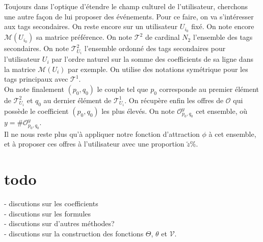\documentclass[11pt, oneside]{article}
\begin{document}
Toujours dans l'optique d'étendre le champ culturel de l'utilisateur, cherchons une autre façon de lui proposer des événements. Pour ce faire, on va s'intéresser aux tags secondaires. On reste encore sur un utilisateur $U_{i_0}$ fixé. On note encore $\mathcal{M} (U_{i_0})$ sa matrice préférence. On note $\mathcal{T}^2$ de cardinal $N_2$ l'ensemble des tags secondaires. On note $\mathcal{T}^2_{U_i}$ l'ensemble ordonné des tags secondaires pour l'utilisateur $U_i$ par l'ordre naturel sur la somme des coefficients de sa ligne dans la matrice $\mathcal{M} (U_{i})$ par exemple. On utilise des notations symétrique pour les tags principaux avec $\mathcal{T}^1$. \\
On note finalement $(p_0,q_0)$ le couple tel que $p_0$ corresponde au premier élément de $\mathcal{T}^2_{U_i}$ et $q_0$ au dernier élément de $\mathcal{T}^1_{U_i}$. On récupère enfin les offres de $\mathcal{O}$ qui possède le coefficient $(p_0,q_0)$ les plus élevés. On note $\mathcal{O}_{p_0,q_0}^y$ cet ensemble, où $y = \# \mathcal{O}_{p_0,q_0}^y$. \\

Il ne nous reste plus qu'à appliquer notre fonction d'attraction $\phi$ à cet ensemble, et à proposer ces offres à l'utilisateur avec une proportion $\tilde{z} \%$.

\section{todo}

- discutions sur les coefficients \\
- discutions sur les formules \\
- discutions sur d'autres méthodes? \\
- discutions sur la construction des fonctions $\Theta$, $\theta$ et $\mathcal{V}$. \\
\end{document}
